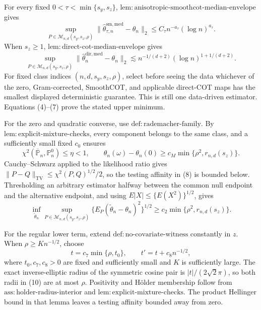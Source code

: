 For every fixed \(0<\tau<\min\{s_y,s_z\}\), \(\mathrm{lem{:}anisotropic\text{-}smoothcot\text{-}median\text{-}envelope}\) gives
\[
\sup_{P\in\mathcal M_{n,d}(s_y,s_z,\rho)}
\|\widehat\theta^{\mathrm{sm,med}}_{\tau,n}-\theta_n\|_2
\le C_\tau n^{-a_\tau}(\log n)^{a_\tau}.                                      \tag{6}
\]
When \(s_z\ge1\), \(\mathrm{lem{:}direct\text{-}cot\text{-}median\text{-}envelope}\) gives
\[
\sup_{P\in\mathcal M_{n,d}(s_y,s_z,\rho)}
\|\widehat\theta_n^{\mathrm{dir,med}}-\theta_n\|_2
\lesssim n^{-1/(d+2)}(\log n)^{1+1/(d+2)}.                                     \tag{7}
\]
For fixed class indices \((n,d,s_y,s_z,\rho)\), select before seeing the data whichever of the zero, Gram-corrected, SmoothCOT, and applicable direct-COT maps has the smallest displayed deterministic guarantee.  This is still one data-driven estimator.  Equations (4)--(7) prove the stated upper minimum.

For the zero and quadratic converse, use \(\mathrm{def{:}rademacher\text{-}family}\).  By \(\mathrm{lem{:}explicit\text{-}mixture\text{-}checks}\), every component belongs to the same class, and a sufficiently small fixed \(c_0\) ensures
\[
\chi^2(\overline{\mathbb P}_n,\mathbb P_n^0)\le\eta<1,
\qquad
\theta_n(\omega)-\theta_n(0)
\ge c_M\min\{\rho^2,r_{n,d}(s_z)\}.                                            \tag{8}
\]
Cauchy--Schwarz applied to the likelihood ratio gives
\(\|P-Q\|_{\mathrm{TV}}\le\chi^2(P,Q)^{1/2}/2\), so the testing affinity in (8) is bounded below.  Thresholding an arbitrary estimator halfway between the common null endpoint and the alternative endpoint, and using \(E|X|\le\{E(X^2)\}^{1/2}\), gives
\[
\inf_{\widetilde\theta_n}\sup_{P\in\mathcal M_{n,d}(s_y,s_z,\rho)}
\{E_P(\widetilde\theta_n-\theta_n)^2\}^{1/2}
\ge c_2\min\{\rho^2,r_{n,d}(s_z)\}.                                           \tag{9}
\]

For the regular lower term, extend \(\mathrm{def{:}no\text{-}covariate\text{-}witness}\) constantly in \(z\).  When \(\rho\ge K n^{-1/2}\), choose
\[
t=c_7\min\{\rho,t_0\},
\qquad t'=t+c_8n^{-1/2},                                                        \tag{10}
\]
where \(t_0,c_7,c_8>0\) are fixed and sufficiently small and \(K\) is sufficiently large.  The exact inverse-elliptic radius of the symmetric cosine pair is \(|t|/(2\sqrt2\pi)\), so both radii in (10) are at most \(\rho\).  Positivity and H\"older membership follow from \(\mathrm{ass{:}holder\text{-}radius\text{-}interior}\) and \(\mathrm{lem{:}explicit\text{-}mixture\text{-}checks}\).  The product Hellinger bound in that lemma leaves a testing affinity bounded away from zero.


